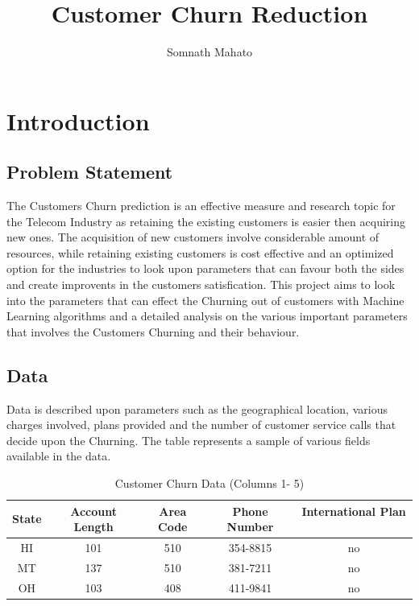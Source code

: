 \documentclass[a4paper,12pt]{report}
\begin{document}
\title{Customer Churn Reduction}
\author{Somnath Mahato}
\maketitle





\tableofcontents{}

\chapter{Introduction}


\section{Problem Statement}
The Customers Churn prediction is an effective measure and research topic for the Telecom Industry as retaining the existing customers is easier then acquiring new ones. The acquisition of new customers involve considerable amount of resources, while retaining existing customers is cost effective and an optimized option for the industries to look upon parameters that can favour both the sides and create improvents in the customers satisfication. This project aims to look into the parameters that can effect the Churning out of customers with Machine Learning algorithms and a detailed analysis on the various important parameters that involves the Customers Churning and their behaviour.

\section{Data}
Data is described upon parameters such as the geographical location, various charges involved, plans provided and the number of customer service calls  that decide upon the Churning. The table represents a sample of various fields available in the data. 


\begin{table}[ht]
\caption{Customer Churn Data (Columns 1- 5)} %
\centering %
\begin{tabular}{c c c c c } %
\hline %
State &  Account Length  &  Area Code & Phone Number & International Plan \ \\ [0.5ex] %
\hline %
HI & 101 & 510 & 354-8815 & no\\ %
MT & 137 & 510 & 381-7211 & no\\
OH & 103 & 408 & 411-9841 & no\\ [1ex] %
\hline %
\end{tabular}
\label{table:nonlin} %
\end{table}
\end{document}
